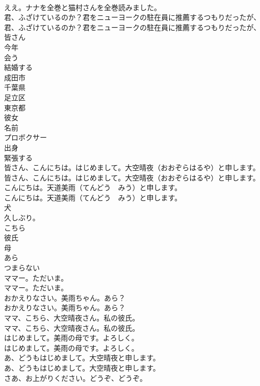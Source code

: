\documentclass[8pt]{extreport}
\begin{document}
\begin{CJK}{UTF8}{min}
\\	ええ。ナナを全巻と猫村さんを全巻読みました。 
\\	君、ふざけているのか？君をニューヨークの駐在員に推薦するつもりだったが、	
\\	君、ふざけているのか？君をニューヨークの駐在員に推薦するつもりだったが、 
\\	皆さん
\\	今年
\\	会う
\\	結婚する
\\	成田市
\\	千葉県
\\	足立区
\\	東京都
\\	彼女
\\	名前
\\	プロボクサー
\\	出身
\\	緊張する
\\	皆さん、こんにちは。はじめまして。大空晴夜（おおぞらはるや）と申します。	
\\	皆さん、こんにちは。はじめまして。大空晴夜（おおぞらはるや）と申します。 
\\	こんにちは。天道美雨（てんどう　みう）と申します。	
\\	こんにちは。天道美雨（てんどう　みう）と申します。 
\\	犬
\\	久しぶり。
\\	こちら
\\	彼氏
\\	母
\\	あら
\\	つまらない
\\	ママー。ただいま。	
\\	ママー。ただいま。 
\\	おかえりなさい。美雨ちゃん。あら？	
\\	おかえりなさい。美雨ちゃん。あら？ 
\\	ママ、こちら、大空晴夜さん。私の彼氏。	
\\	ママ、こちら、大空晴夜さん。私の彼氏。 
\\	はじめまして。美雨の母です。よろしく。	
\\	はじめまして。美雨の母です。よろしく。 
\\	あ、どうもはじめまして。大空晴夜と申します。	
\\	あ、どうもはじめまして。大空晴夜と申します。 
\\	さあ、お上がりください。どうぞ、どうぞ。	

\end{CJK}
\end{document}
